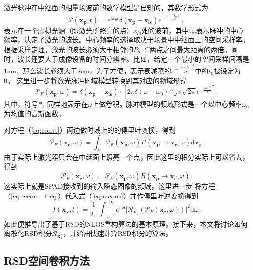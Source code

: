 \documentclass[master]{shtthesis}             %
\begin{document}
激光脉冲在中继面的相量场波前的数学模型是已知的，其数学形式为
\begin{equation}\label{eq:impul}
 \mathcal{P}(\mathbf{x_p},t) = e^{i\omega_0 t}\delta(\mathbf{x_p}-\mathbf{x_{ls}})e^{-\frac{(t-t_0)^2}{2\sigma^2}},
\end{equation}
表示在一个虚拟光源（即激光所照亮的点）$x_{ls}$处的波前，其中$\omega_0$表示脉冲的中心频率，决定了激光的波长。中心频率的选择取决于场景中中继面上的空间采样率。根据采样定理，激光的波长必须大于相邻的$P$、$C$两点之间最大距离的两倍。同时，波长还要大于成像设备的时间分辨率\citep{Liu2019}。比如，给定一个最小的空间采样间隔是1cm，那么波长必须大于2cm。为了方便，表示衰减项的$e^{-\frac{(t-t_0)^2}{2\sigma^2}}$中的$t_0$被设定为0。
这里进一步将激光脉冲时域模型转换到其对应的频域形式
\begin{equation} \label{eq:impul_freq}
 \mathcal{P}_F(\mathbf{x_p},\omega) = \delta(\mathbf{x_p}-\mathbf{x_{ls}})\cdot \left[ 2\pi\delta(\omega-\omega_0)*_\omega\sigma\sqrt{2\pi}e^{-\frac{\sigma^2\omega^2}{2}} \right].
\end{equation}
其中，符号$*_\omega$同样地表示在$\omega$上做卷积。脉冲模型的频域形式是一个以中心频率$\omega_0$为均值的高斯函数。

对方程（\ref{eq:convt}）两边做时域上的的傅里叶变换，得到
\begin{equation}
  \mathcal{P}_F(\mathbf{x_c},\omega) = \int_P \mathcal{P}_F(\mathbf{x_p},\omega) H(\mathbf{x_p}\rightarrow \mathbf{x_c},\omega) \text{d}\mathbf{x_p}.
\end{equation}
由于实际上激光器只会在中继面上照亮一个点，因此这里的积分实际上可以省去，得到
\begin{equation}\label{eq:input_trans}
  \mathcal{P}_F(\mathbf{x_c},\omega) = \mathcal{P}_F(\mathbf{x_p},\omega) H(\mathbf{x_p}\rightarrow \mathbf{x_c},\omega).
\end{equation}
这实际上就是SPAD接收到的输入瞬态图像的频域。这里进一步
将方程（\ref{eq:recons_freq}）代入式（\ref{eq:recons}）并作傅里叶逆变换得到
\begin{equation}\label{eq:rsd_recons_pp}
  I(\mathbf{x_v},t)=\frac{1}{2\pi}\int_{-\infty}^{+\infty}e^{i\omega t}\Big| \mathcal{R}_{\mathbf{x_v}} \left( \mathcal{P}_F(\mathbf{x_c},\omega) \right) \Big|^2 \text{d}\omega.
\end{equation}
如此便推导出了基于RSD的NLOS重构算法的基本原理。接下来，本文将讨论如何离散化RSD积分$\mathcal{R}_{\mathbf{x_v}}$，并给出快速计算RSD积分的算法。

\subsection{RSD空间卷积方法}\label{sec:rsd_space_conv}
\end{document}
